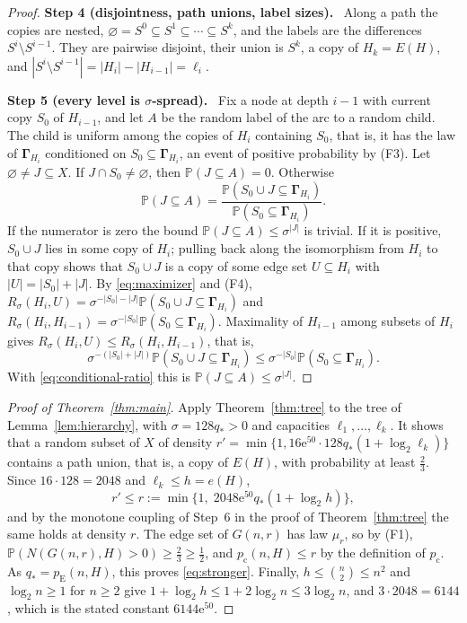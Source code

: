 \documentclass[11pt]{article}
\numberwithin{equation}{section}
\newcommand{\PP}{\mathbb P}
\newcommand{\pc}{p_{\mathrm c}}
\newcommand{\pE}{p_{\mathrm E}}
\newcommand{\ee}{\mathrm e}
\newcommand{\GG}{\boldsymbol\Gamma}
\newcommand{\qs}{q_*}
\newcommand{\step}[2]{\par\medskip\noindent\textbf{Step #1 (#2).}\ }
\begin{document}
\begin{proof}
\step{4}{disjointness, path unions, label sizes}
Along a path the copies are nested,
$\varnothing=S^0\subseteq S^1\subseteq\cdots\subseteq S^k$, and the
labels are the differences $S^i\setminus S^{i-1}$. They are pairwise
disjoint, their union is $S^k$, a copy of $H_k=E(H)$, and
$|S^i\setminus S^{i-1}|=|H_i|-|H_{i-1}|=\ell_i$.

\step{5}{every level is $\sigma$-spread}
Fix a node at depth $i-1$ with current copy $S_0$ of $H_{i-1}$, and let
$A$ be the random label of the arc to a random child. The child is
uniform among the copies of $H_i$ containing $S_0$, that is, it has the
law of $\GG_{H_i}$ conditioned on $S_0\subseteq\GG_{H_i}$, an event of
positive probability by (F3). Let $\varnothing\ne J\subseteq X$. If
$J\cap S_0\ne\varnothing$, then $\PP(J\subseteq A)=0$. Otherwise
\begin{equation}\label{eq:conditional-ratio}
 \PP(J\subseteq A)=
 \frac{\PP(S_0\cup J\subseteq\GG_{H_i})}
      {\PP(S_0\subseteq\GG_{H_i})}.
\end{equation}
If the numerator is zero the bound $\PP(J\subseteq A)\le\sigma^{|J|}$
is trivial. If it is positive, $S_0\cup J$ lies in some copy of $H_i$;
pulling back along the isomorphism from $H_i$ to that copy shows that
$S_0\cup J$ is a copy of some edge set $U\subseteq H_i$ with
$|U|=|S_0|+|J|$. By \eqref{eq:maximizer} and (F4),
$R_\sigma(H_i,U)=\sigma^{-|S_0|-|J|}\PP(S_0\cup J\subseteq\GG_{H_i})$
and
$R_\sigma(H_i,H_{i-1})=\sigma^{-|S_0|}\PP(S_0\subseteq\GG_{H_i})$.
Maximality of $H_{i-1}$ among subsets of $H_i$ gives
$R_\sigma(H_i,U)\le R_\sigma(H_i,H_{i-1})$, that is,
\[
 \sigma^{-(|S_0|+|J|)}\PP(S_0\cup J\subseteq\GG_{H_i})
 \le \sigma^{-|S_0|}\PP(S_0\subseteq\GG_{H_i}).
\]
With \eqref{eq:conditional-ratio} this is
$\PP(J\subseteq A)\le\sigma^{|J|}$.
\end{proof}

\begin{proof}[Proof of Theorem~\ref{thm:main}]
Apply Theorem~\ref{thm:tree} to the tree of Lemma~\ref{lem:hierarchy},
with $\sigma=128\qs>0$ and capacities $\ell_1,\ldots,\ell_k$. It shows
that a random subset of $X$ of density
$r'=\min\{1,16\ee^{50}\cdot128\qs(1+\log_2\ell_k)\}$ contains a path
union, that is, a copy of $E(H)$, with probability at least $\frac23$.
Since $16\cdot128=2048$ and $\ell_k\le h=e(H)$,
\[
 r'\le r:=\min\{1,\;2048\ee^{50}\qs(1+\log_2 h)\},
\]
and by the monotone coupling of Step~6 in the proof of
Theorem~\ref{thm:tree} the same holds at density $r$. The edge set of
$G(n,r)$ has law $\mu_r$, so by (F1),
$\PP(N(G(n,r),H)>0)\ge\frac23\ge\frac12$, and $\pc(n,H)\le r$ by the
definition of $\pc$. As $\qs=\pE(n,H)$, this proves
\eqref{eq:stronger}. Finally,
$h\le\binom n2\le n^2$ and $\log_2n\ge1$ for $n\ge2$ give
$1+\log_2 h\le1+2\log_2n\le3\log_2 n$, and $3\cdot2048=6144$, which is
the stated constant $6144\ee^{50}$.
\end{proof}
\end{document}
